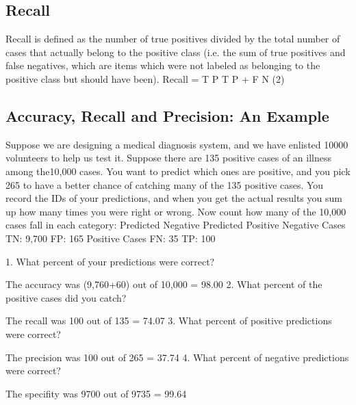 \documentclass[a4paper,12pt]{article}
\begin{document}
\subsection{Recall}
Recall is defined as the number of true positives divided by the total number of cases that actually
belong to the positive class (i.e. the sum of true positives and false negatives, which are items
which were not labeled as belonging to the positive class but should have been).
Recall = T P
T P + F N
(2)
\subsection{Accuracy, Recall and Precision: An Example}
Suppose we are designing a medical diagnosis system, and we have enlisted 10000 volunteers to
help us test it. Suppose there are 135 positive cases of an illness among the10,000 cases. You want
to predict which ones are positive, and you pick 265 to have a better chance of catching many of
the 135 positive cases. You record the IDs of your predictions, and when you get the actual results
you sum up how many times you were right or wrong.
Now count how many of the 10,000 cases fall in each category:
Predicted Negative Predicted Positive
Negative Cases TN: 9,700 FP: 165
Positive Cases FN: 35 TP: 100


1. What percent of your predictions were correct?
\item  The accuracy was (9,760+60) out of 10,000 = 98.00%
2. What percent of the positive cases did you catch?
\item  The recall was 100 out of 135 = 74.07%
3. What percent of positive predictions were correct?
\item  The precision was 100 out of 265 = 37.74%
4. What percent of negative predictions were correct?
\item  The specifity was 9700 out of 9735 = 99.64%
\end{document}
